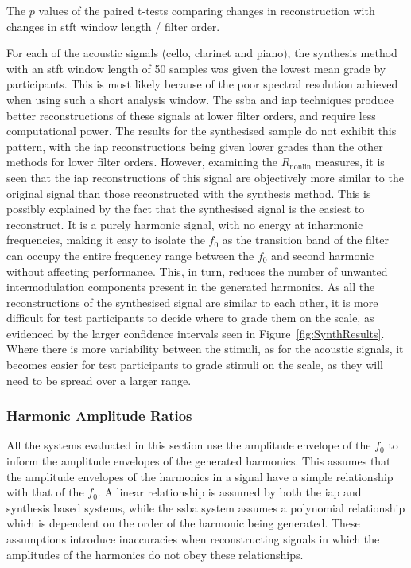 			\begin{table}[h!]
				\centering
				
				\caption{The $p$ values of the paired t-tests comparing changes in reconstruction
					 with changes in \acrshort{stft} window length
					 / filter order.}
				\label{tab:SMCTTests}
			\end{table}

			For each of the acoustic signals (cello, clarinet and piano), the synthesis method with an
			\acrshort{stft} window length of 50 samples was given the lowest mean grade by participants. This
			is most likely because of the poor spectral resolution achieved when using such a short analysis
			window. The \acrshort{ssba} and \acrshort{iap} techniques produce better reconstructions of these
			signals at lower filter orders, and require less computational power. The results for the
			synthesised sample do not exhibit this pattern, with the \acrshort{iap} reconstructions being given
			lower grades than the other methods for lower filter orders.  However, examining the
			$R_{\mathrm{nonlin}}$ measures, it is seen that the \acrshort{iap} reconstructions of this signal
			are objectively more similar to the original signal than those reconstructed with the synthesis
			method. This is possibly explained by the fact that the synthesised signal is the easiest to
			reconstruct. It is a purely harmonic signal, with no energy at inharmonic frequencies, making it
			easy to isolate the $f_{0}$ as the transition band of the filter can occupy the entire frequency
			range between the $f_{0}$ and second harmonic without affecting performance. This, in turn, reduces
			the number of unwanted intermodulation components present in the generated harmonics. As all the
			reconstructions of the synthesised signal are similar to each other, it is more difficult for test
			participants to decide where to grade them on the scale, as evidenced by the larger confidence
			intervals seen in Figure~\ref{fig:SynthResults}. Where there is more variability between the
			stimuli, as for the acoustic signals, it becomes easier for test participants to grade stimuli on
			the scale, as they will need to be spread over a larger range.

		\subsubsection*{Harmonic Amplitude Ratios}
			All the systems evaluated in this section use the amplitude envelope of the $f_{0}$ to inform the
			amplitude envelopes of the generated harmonics. This assumes that the amplitude envelopes of the
			harmonics in a signal have a simple relationship with that of the $f_{0}$. A linear relationship is
			assumed by both the \acrshort{iap} and synthesis based systems, while the \acrshort{ssba} system
			assumes a polynomial relationship which is dependent on the order of the harmonic being generated.
			These assumptions introduce inaccuracies when reconstructing signals in which the amplitudes of the
			harmonics do not obey these relationships.
			
